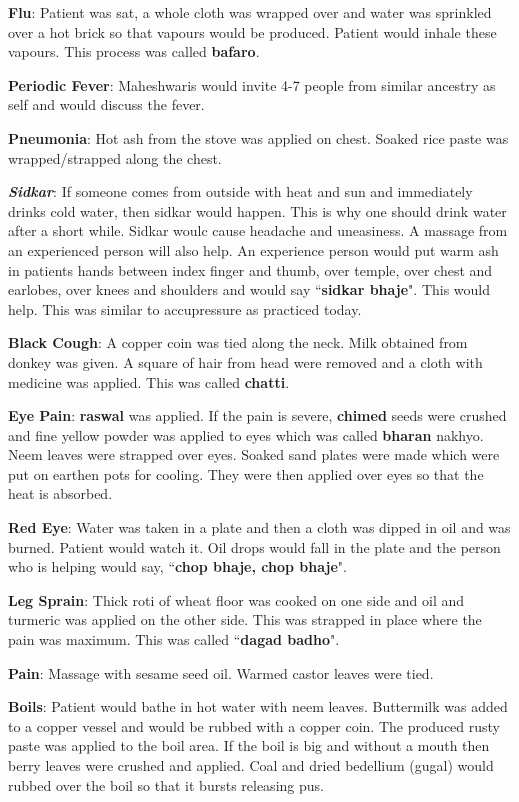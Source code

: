 \textbf{Flu}: Patient was sat, a whole cloth was wrapped over and water was
sprinkled over a hot brick so that vapours would be produced. Patient would
inhale these vapours. This process was called \textbf{bafaro}.

\textbf{Periodic Fever}: Maheshwaris would invite 4-7 people from similar
ancestry as self and would discuss the fever.

\textbf{Pneumonia}: Hot ash from the stove was applied on chest. Soaked rice
paste was wrapped/strapped along the chest.

\textbf{\textit{Sidkar}}: If someone comes from outside with heat and sun and
immediately drinks cold water, then sidkar would happen. This is why one should
drink water after a short while. Sidkar woulc cause headache and uneasiness. A
massage from an experienced person will also help. An experience person would
put warm ash in patients hands between index finger and thumb, over temple,
over chest and earlobes, over knees and shoulders and would say
``\textbf{sidkar bhaje}". This would help. This was similar to accupressure as
practiced today.

\textbf{Black Cough}: A copper coin was tied along the neck. Milk obtained from
donkey was given. A square of hair from head were removed and a cloth with
medicine was applied. This was called \textbf{chatti}.

\textbf{Eye Pain}: \textbf{raswal} was applied. If the pain is severe,
\textbf{chimed} seeds were crushed and fine yellow powder was applied to eyes
which was called \textbf{bharan} nakhyo. Neem leaves were strapped over eyes.
Soaked sand plates were made which were put on earthen pots for cooling. They
were then applied over eyes so that the heat is absorbed. 

\textbf{Red Eye}: Water was taken in a plate and then a cloth was dipped in oil
and was burned. Patient would watch it. Oil drops would fall in the plate and
the person who is helping would say, ``\textbf{chop bhaje, chop bhaje}". 

\textbf{Leg Sprain}: Thick roti of wheat floor was cooked on one side and oil
and turmeric was applied on the other side. This was strapped in place where
the pain was maximum. This was called ``\textbf{dagad badho}".

\textbf{Pain}: Massage with sesame seed oil. Warmed castor leaves were tied.

\textbf{Boils}: Patient would bathe in hot water with neem leaves. Buttermilk
was added to a copper vessel and would be rubbed with a copper coin. The
produced rusty paste was applied to the boil area. If the boil is big and
without a mouth then berry leaves were crushed and applied. Coal and dried
bedellium (gugal) would rubbed over the boil so that it bursts releasing pus.

